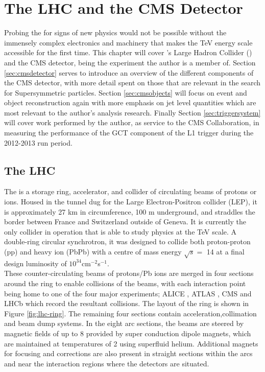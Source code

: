 \chapter{The LHC and the CMS Detector}
\label{chap:cmsoverview}

Probing the \SM for signs of new physics would not be possible without the immensely complex electronics and machinery that makes the TeV energy scale accessible for the first time. This chapter will cover \CERN 's  Large Hadron Collider (\LHC) and the CMS detector, being the experiment the author is a member of. Section \ref{sec:cmsdetector} serves to introduce an overview of the different components of  the CMS detector, with more detail spent on those that are relevant in the search for Supersymmetric particles. Section \ref{sec:cmsobjects} will focus on event and object reconstruction again with more emphasis on jet level quantities which are most relevant to the author's analysis research. Finally Section \ref{sec:triggersystem} will cover work performed by the author, as service to the CMS Collaboration, in measuring the performance of the GCT component of the L1 trigger during the 2012-2013 run period.  


\section{The LHC}
\label{sec:thelhc} 

The \LHC is a storage ring, accelerator, and collider of circulating beams of protons or ions. Housed in the tunnel dug for the Large Electron-Positron collider (LEP), it is approximately 27 km in circumference, 100 m underground, and straddles the border between France and Switzerland outside of Geneva. It is currently the only collider in operation that is able to study physics at the TeV scale.  A double-ring circular synchrotron, it was
designed to collide both proton-proton (pp) and heavy ion (PbPb) with a centre of mass energy $\sqrt{s} = $ 14 \TeV at a final design luminosity of $10^{34}$cm$^{-2}$s$^{-1}$. \\

These counter-circulating beams of protons/Pb ions are merged in four sections around the ring to enable collisions of the beams, with each interaction point being home to one of the four major experiments; ALICE \cite{alicetdr} , ATLAS \cite{atlastdr}, CMS \cite{cmstdr} and LHCb \cite{lhcbtdr} which record the resultant collisions. The layout of the \LHC ring is shown in Figure \ref{fig:lhc-ring}. The remaining four sections contain acceleration,collimation and beam dump systems. In the eight arc sections, the beams are steered by magnetic fields of up to 8 \T provided by super conduction dipole magnets, which are maintained at temperatures of 2 \K using superfluid helium. Additional magnets for focusing and corrections are also present in straight sections within the arcs and near the interaction regions where the detectors are situated. \\


